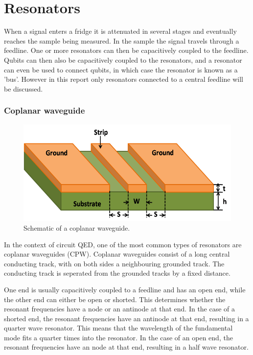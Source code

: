 \part{Resonators}
\label{chapter:Resonators}


When a signal enters a fridge it is attenuated in several stages and eventually reaches the sample being measured. In the sample the signal travels through a feedline. One or more resonators can then be capacitively coupled to the feedline. Qubits can then also be capacitively coupled to the resonators, and a resonator can even be used to connect qubits, in which case the resonator is known as a 'bus'. However in this report only resonators connected to a central feedline will be discussed.









\section{Coplanar waveguide}

\begin{figure}
    \begin{center}
        \includegraphics[width=.4\textwidth]{Figures/DRIE/CPW.png}
    \end{center}
    \caption{Schematic of a coplanar waveguide.}
    \label{fig:CPW}
\end{figure}

In the context of circuit QED, one of the most common types of resonators are coplanar waveguides (CPW). Coplanar waveguides consist of a long central conducting track, with on both sides a neighbouring grounded track. The conducting track is seperated from the grounded tracks by a fixed distance.

One end is usually capacitively coupled to a feedline and has an open end, while the other end can either be open or shorted. This determines whether the resonant frequencies have a node or an antinode at that end. In the case of a shorted end, the resonant frequencies have an antinode at that end, resulting in a quarter wave resonator. This means that the wavelength of the fundamental mode fits a quarter times into the resonator. In the case of an open end, the resonant frequencies have an node at that end, resulting in a half wave resonator.









